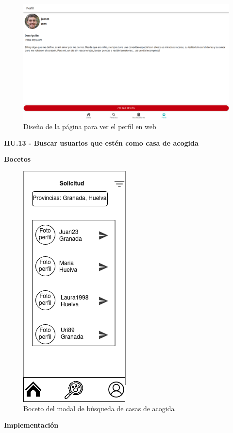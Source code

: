 \begin{figure}[H]
	\centering
	\includegraphics[width=1\linewidth]{sprint 3//hu11-12/implementacionWeb.png}
	\caption{Diseño de la página para ver el perfil en web}
\end{figure}

\Large{\textbf{HU.13 - Buscar usuarios que estén como casa de acogida}}

\textbf{Bocetos} \\
\begin{figure}[H]
	\centering
	\includegraphics[width=0.31\linewidth]{sprint 3//hu13/boceto.png}
	\caption{Boceto del modal de búsqueda de casas de acogida }
\end{figure}

\textbf{Implementación}

